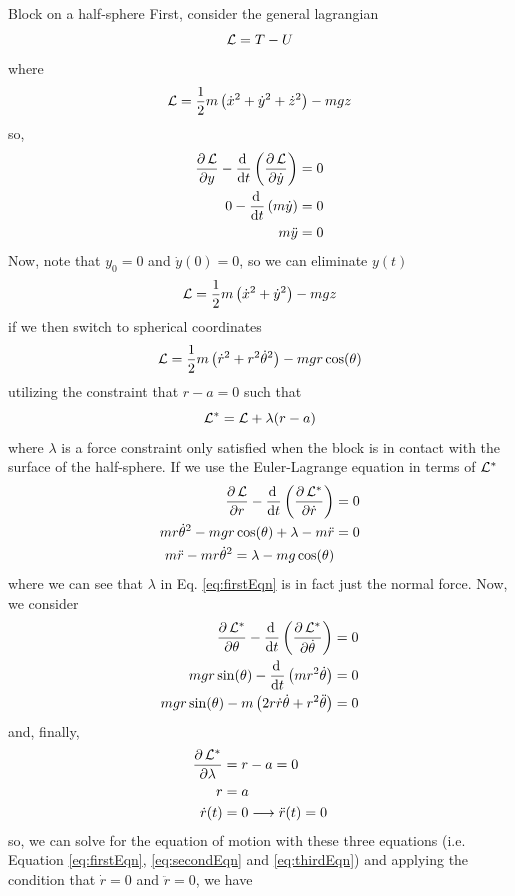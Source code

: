 \documentclass[11pt]{article}
\begin{document}
\begin{example}{Block on a half-sphere}
\noindent First, consider the general lagrangian
\[ \mathcal{L} = T-U \]
where
\[ \mathcal{L} = \frac{1}{2} m \left(\dot{x}^2 + \dot{y}^2 + \dot{z}^2 \right) - mgz \]
so,
\begin{align*}
  \frac{\partial\, \mathcal{L}}{\partial y} - \frac{\mathrm{d}\, }{\mathrm{d} t} \left(\frac{\partial\, \mathcal{L}}{\partial \dot{y}} \right) &= 0\\
  0 - \frac{\mathrm{d}\, }{\mathrm{d} t} \left(m\dot{y} \right) &= 0\\
  m\ddot{y} &= 0
\end{align*}
Now, note that $y_0=0$ and $\dot{y}(0)=0$, so we can eliminate $y(t)$
\[ \mathcal{L} = \frac{1}{2} m \left(\dot{x}^2 + \dot{y}^2 \right) - mgz \]
if we then switch to spherical coordinates
\[ \mathcal{L} = \frac{1}{2} m \left( \dot{r}^2 + r^2 \dot{\theta}^2\right) - mgr \cos(\theta)\]
utilizing the constraint that $r-a=0$ such that
\[ \mathcal{L}^* = \mathcal{L} + \lambda(r-a) \]
where $\lambda$ is a force constraint only satisfied when the block is in contact with the surface of the half-sphere. If we use the Euler-Lagrange equation in terms of $\mathcal{L}^*$
\begin{align}
  \frac{\partial\, \mathcal{L}}{\partial r} - \frac{\mathrm{d}\, }{\mathrm{d} t} \left(\frac{\partial\, \mathcal{L}^*}{\partial \dot{r}} \right) &= 0 \nonumber\\
  mr\dot{\theta}^2 - mgr\cos(\theta) + \lambda - m\ddot{r} &= 0 \nonumber\\
  m\ddot{r} - mr\dot{\theta}^2 = \lambda - mg\cos(\theta) \label{eq:firstEqn}
\end{align}
where we can see that $\lambda$ in Eq. \eqref{eq:firstEqn} is in fact just the normal force. Now, we consider
\begin{align}
  \frac{\partial\, \mathcal{L}^*}{\partial \theta} - \frac{\mathrm{d}\, }{\mathrm{d} t} \left(\frac{\partial\, \mathcal{L}^*}{\partial \dot{\theta}} \right) &= 0 \nonumber\\
  mgr\sin(\theta) - \frac{\mathrm{d}\, }{\mathrm{d} t} \left(mr^2 \dot{\theta} \right) &= 0 \nonumber \\
  mgr\sin(\theta) - m\left(2 r \dot{r} \dot{\theta} + r^2 \ddot{\theta} \right) &= 0 \label{eq:secondEqn}
\end{align}
and, finally,
\begin{align}
  \frac{\partial\, \mathcal{L}^*}{\partial \lambda} &= r-a = 0 \nonumber\\
  r &= a \nonumber\\
  \dot{r}(t) &= 0 \longrightarrow \ddot{r}(t) = 0 \label{eq:thirdEqn}
\end{align}
so, we can solve for the equation of motion with these three equations (i.e. Equation \eqref{eq:firstEqn}, \eqref{eq:secondEqn} and \eqref{eq:thirdEqn}) and applying the condition that $\dot{r}=0$ and $\ddot{r}=0$, we have
\begin{align*}

\end{align*}
\end{example}
\end{document}
